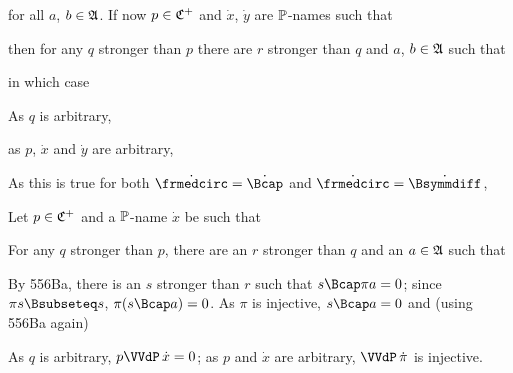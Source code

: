 {\noindent for all $a$, $b\in\frak A$.   If now $p\in\frak C^+$ and
$\dot x$, $\dot y$ are $\Bbb P$-names such that


\noindent then for any $q$ stronger than $p$ there are $r$ stronger than
$q$ and $a$, $b\in\frak A$ such that


\noindent in which case


\noindent As $q$ is arbitrary,


\noindent as $p$, $\dot x$ and $\dot y$ are arbitrary,


\noindent As this is true for both $\dot\frmedcirc=\dot\Bcap$ and
$\dot\frmedcirc=\dot\Bsymmdiff$,


\medskip

Let $p\in\frak C^+$ and a $\Bbb P$-name $\dot x$ be such that


\noindent For any $q$ stronger than $p$, there are an $r$ stronger than $q$
and an $a\in\frak A$ such that


\noindent By 556Ba, there is an $s$ stronger than $r$ such that
$s\Bcap\pi a=0$;  since $\pi s\Bsubseteq s$,
$\pi(s\Bcap a)=0$.   As $\pi$ is injective, $s\Bcap a=0$ and (using 556Ba
again)


\noindent As $q$ is arbitrary, $p\VVdP\,\dot x=0$;  as $p$ and $\dot x$ are
arbitrary, $\VVdP\,\dot\pi$ is injective.

\medskip

}

